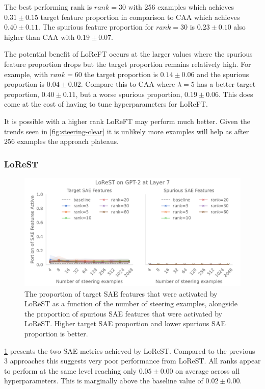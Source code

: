 The best performing rank is $rank = 30$ with 256 examples which achieves $0.31 \pm 0.15$ target feature proportion in comparison to CAA which achieves $0.40 \pm 0.11$.
The spurious feature proportion for $rank = 30$ is $0.23 \pm 0.10$ also higher than CAA with $0.19 \pm 0.07$.

The potential benefit of LoReFT occurs at the larger values where the spurious feature proportion drops but the target proportion remains relatively high.
For example, with $rank = 60$ the target proportion is $0.14 \pm 0.06$ and the spurious proportion is $0.04 \pm 0.02$.
Compare this to CAA where $\lambda = 5$ has a better target proportion, $0.40 \pm 0.11$, but a worse spurious proportion, $0.19 \pm 0.06$.
This does come at the cost of having to tune hyperparameters for LoReFT.

It is possible with a higher rank LoReFT may perform much better.
Given the trends seen in \cref{fig:steering-clear} it is unlikely more examples will help as after 256 examples the approach plateaus.

\subsubsection{LoReST}

\begin{figure}
    \centering
    \captionsetup{width=.9\textwidth}
    \includegraphics[width=\textwidth]{figures/gpt2_7_lorest.pdf}
    \caption{
        The proportion of target SAE features that were activated by LoReST as a function of the number of steering examples, alongside the proportion of spurious SAE features that were activated by LoReST.
        Higher target SAE proportion and lower spurious SAE proportion is better.
    }
    \label{fig:gpt-lorest}
\end{figure}

\cref{fig:gpt-lorest} presents the two SAE metrics achieved by LoReST.
Compared to the previous 3 approaches this suggests very poor performance from LoReST.
All ranks appear to perform at the same level reaching only $0.05 \pm 0.00$ on average across all hyperparameters.
This is marginally above the baseline value of $0.02 \pm 0.00$.

